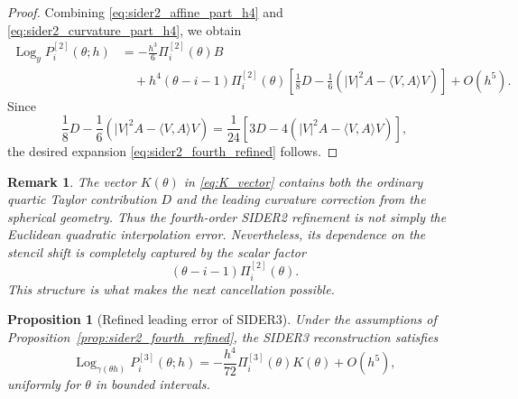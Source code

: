 \documentclass[a4paper,11pt]{article}
\newcommand{\Log}{\operatorname{Log}}
\newtheorem{prop}{Proposition}
\newtheorem{remark}{Remark}
\numberwithin{equation}{section}
\begin{document}
\begin{proof}
Combining \eqref{eq:sider2_affine_part_h4} and
\eqref{eq:sider2_curvature_part_h4}, we obtain
\[
\begin{aligned}
\Log_y P_i^{[2]}(\theta;h)
&=
-\frac{h^3}{6}\Pi_i^{[2]}(\theta)B        \\
&\quad
+
h^4(\theta-i-1)\Pi_i^{[2]}(\theta)
\left[
\frac18D
-
\frac16\left(|V|^2A-\langle V,A\rangle V\right)
\right]
+
O(h^5).
\end{aligned}
\]
Since
\[
        \frac18D
        -
        \frac16\left(|V|^2A-\langle V,A\rangle V\right)
        =
        \frac1{24}
        \left[
        3D
        -
        4\left(|V|^2A-\langle V,A\rangle V\right)
        \right],
\]
the desired expansion \eqref{eq:sider2_fourth_refined} follows.
\end{proof}

\begin{remark}
The vector \(K(\theta)\) in \eqref{eq:K_vector} contains both the ordinary
quartic Taylor contribution \(D\) and the leading curvature correction from the
spherical geometry.  Thus the fourth-order SIDER2 refinement is not simply the
Euclidean quadratic interpolation error.  Nevertheless, its dependence on the
stencil shift is completely captured by the scalar factor
\[
        (\theta-i-1)\Pi_i^{[2]}(\theta).
\]
This structure is what makes the next cancellation possible.
\end{remark}

\begin{prop}[Refined leading error of SIDER3]
\label{prop:sider3_refined}
Under the assumptions of Proposition~\ref{prop:sider2_fourth_refined}, the
SIDER3 reconstruction satisfies
\begin{equation}
\label{eq:sider3_refined}
\Log_{\gamma(\theta h)}P_i^{[3]}(\theta;h)
=
-\frac{h^4}{72}
\Pi_i^{[3]}(\theta)K(\theta)
+
O(h^5),
\end{equation}
uniformly for \(\theta\) in bounded intervals.
\end{prop}
\end{document}
